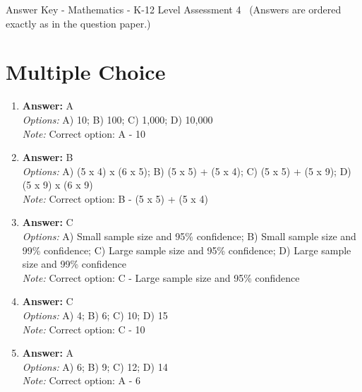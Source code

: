 \documentclass[12pt]{article}
\begin{document}
\begin{center}
Answer Key - Mathematics - K-12 Level Assessment 4 \
\small (Answers are ordered exactly as in the question paper.)
\end{center}

\section*{Multiple Choice}
\begin{enumerate}[label=\arabic*.]
\item \textbf{Answer:} A
\\ \textit{Options:} A) 10; B) 100; C) 1,000; D) 10,000
\\ \textit{Note:} Correct option: A - 10
\item \textbf{Answer:} B
\\ \textit{Options:} A) (5 x 4) x (6 x 5); B) (5 x 5) + (5 x 4); C) (5 x 5) + (5 x 9); D) (5 x 9) x (6 x 9)
\\ \textit{Note:} Correct option: B - (5 x 5) + (5 x 4)
\item \textbf{Answer:} C
\\ \textit{Options:} A) Small sample size and 95\% confidence; B) Small sample size and 99\% confidence; C) Large sample size and 95\% confidence; D) Large sample size and 99\% confidence
\\ \textit{Note:} Correct option: C - Large sample size and 95\% confidence
\item \textbf{Answer:} C
\\ \textit{Options:} A) 4; B) 6; C) 10; D) 15
\\ \textit{Note:} Correct option: C - 10
\item \textbf{Answer:} A
\\ \textit{Options:} A) 6; B) 9; C) 12; D) 14
\\ \textit{Note:} Correct option: A - 6
\end{enumerate}
\end{document}
